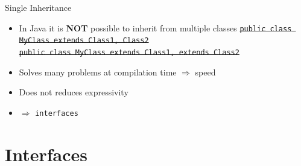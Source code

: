 \documentclass[English,c,%
hyperref={%
  pdftitle={Java Inheritance/Interfaces},%
  pdfauthor={Muller, Gravier, Laforest, Subercaze},%
  pdfsubject={Java Inheritance/Interfaces},%
  pdfkeywords={Inheritance, Interface, Java},%
  colorlinks=true,%
  urlcolor=blue,%
  linkcolor=%
},%
xcolor={pdftex,svgnames} %
]{beamer}
\begin{document}
\begin{frame}{Single Inheritance}

  \begin{itemize}
    \item In Java it is \textbf{NOT} possible to inherit from multiple classes
    \sout{\texttt{public class MyClass extends Class1, Class2}} \\
    \sout{\texttt{public class MyClass extends Class1, extends Class2}}
    \item Solves many problems at compilation time $\Rightarrow$ speed
    \item Does not reduces expressivity
    \bigskip
    \item $\Rightarrow$ \texttt{interfaces}
  \end{itemize}
\end{frame}


\section{Interfaces}
\end{document}
